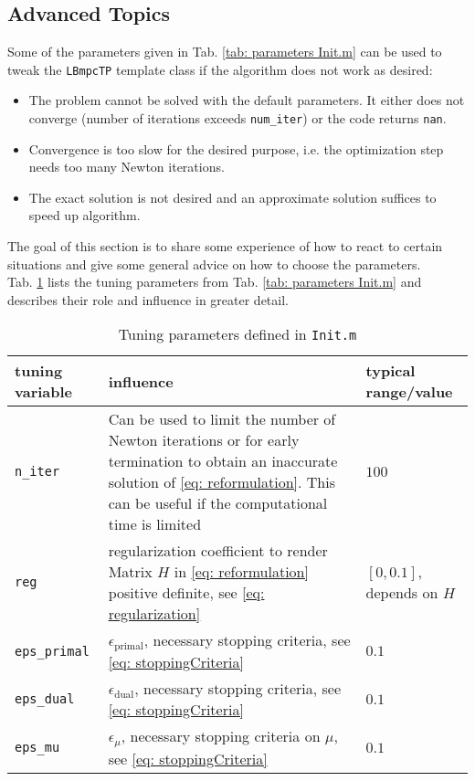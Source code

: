 \documentclass[letter]{article}
\begin{document}
\begin{sffamily}
\section{Advanced Topics}
Some of the parameters given in Tab. \ref{tab: parameters Init.m} can be used to tweak the \texttt{LBmpcTP} template class if the algorithm does not work as desired:
\begin{itemize}
	\item The problem cannot be solved with the default parameters. It either does not converge (number of iterations exceeds \texttt{num\_iter}) or the code returns \texttt{nan}.
	\item Convergence is too slow for the desired purpose, i.e. the optimization step needs too many Newton iterations.
	\item The exact solution is not desired and an approximate solution suffices to speed up algorithm.
\end{itemize}
The goal of this section is to share some experience of how to react to certain situations and give some general advice on how to choose the parameters.\\

\noindent
Tab. \ref{tab: tuning parameters} lists the tuning parameters from Tab. \ref{tab: parameters Init.m} and describes their role and influence in greater detail.

\begin{table}[!htdp]
\caption{Tuning parameters defined in \texttt{Init.m}}
\begin{center}
\begin{tabular}{|p{3.5cm}|p{10cm}|p{3cm}|}\hline
{
	\bf tuning variable} & influence & typical range/value \\ \hline\hline

  \texttt{n\_iter} & Can be used to limit the number of Newton iterations or for early termination to  obtain an inaccurate solution of \eqref{eq: reformulation}. This can be useful if the computational time is limited & $100$ \\ \hline
 \texttt{reg} & regularization coefficient to render Matrix $H$ in \eqref{eq: reformulation} positive definite, see \eqref{eq: regularization}  & $[0,0.1]$, depends on $H$ \\ \hline
 \texttt{eps\_primal} & $\epsilon_\text{primal}$, necessary stopping criteria, see \eqref{eq: stoppingCriteria} & $0.1$ \\ \hline
 \texttt{eps\_dual} & $\epsilon_\text{dual}$, necessary stopping criteria, see \eqref{eq: stoppingCriteria} & $0.1$ \\ \hline
 \texttt{eps\_mu} & $\epsilon_\mu$, necessary stopping criteria on $\mu$, see \eqref{eq: stoppingCriteria} & $0.1$ \\ \hline
\end{tabular}
\end{center}
\label{tab: tuning parameters}
\end{table}



\end{sffamily}
\end{document}
